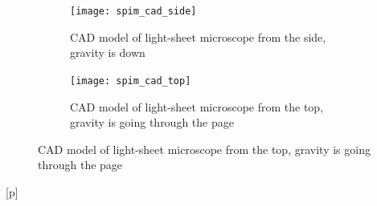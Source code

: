 \begin{figure}[p]
    \begin{leftfullpage}
    \centering
    \begin{subfigure}[b]{\textwidth}
        \centering
        \texttt{[image: spim\_cad\_side]}
        \caption{\gls{CAD} model of \gls{light-sheet} microscope from the side, gravity is down}
        \label{fig:solidworks_design_front}
    \end{subfigure}
    \begin{subfigure}[b]{\textwidth}
        \centering
        \texttt{[image: spim\_cad\_top]}
        \caption{\gls{CAD} model of \gls{light-sheet} microscope from the top, gravity is going through the page}
        \label{fig:soldiworks_top}
    \end{subfigure}   %
\end{leftfullpage}
\end{figure}[p]
